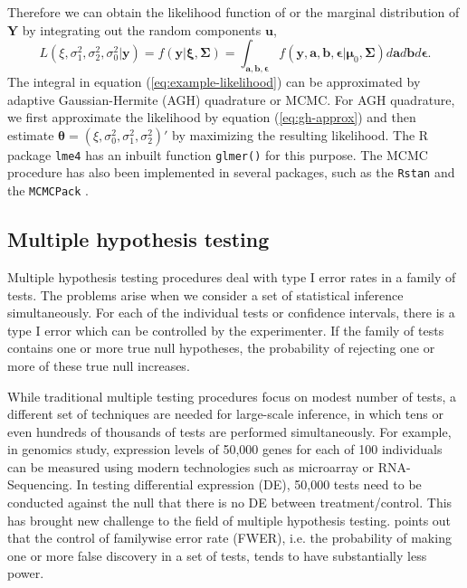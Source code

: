 Therefore we can obtain the likelihood function of or the marginal distribution of $\bm Y$ by
integrating out the random components $\bm u$,
\begin{equation}\label{eq:example-likelihood}
	L(\xi, \sigma_1^2, \sigma_2^2, \sigma_0^2|\bm y)=f(\bm y|\bm \xi, \bm \Sigma)=
	\int_{\bm{a,b,\epsilon}} f(\bm y, \bm a, \bm b, \bm \epsilon |\bm \mu_0, \bm \Sigma)d\bm a d 
	\bm b
	d\bm \epsilon .
\end{equation}
The integral in equation (\ref{eq:example-likelihood}) can be approximated by adaptive
Gaussian-Hermite (AGH) quadrature or MCMC. For AGH quadrature, we first approximate the likelihood
by equation (\ref{eq:gh-approx}) and then estimate $\bm\theta = (\xi, \sigma_0^2, \sigma_1^2,
\sigma_2^2)'$ by maximizing the resulting likelihood. The R package \verb"lme4" 
\citep{bates2012lme4} 
has
an inbuilt function \verb"glmer()" for this purpose. The MCMC procedure has also been implemented 
in several
packages, such as the \verb|Rstan| \citep{Rstan} and the \verb|MCMCPack| 
\citep{martin2011mcmcpack}. 

\subsection{Multiple hypothesis testing}
Multiple hypothesis testing procedures deal with type I error rates in a family of tests. The
problems arise when we consider a set of statistical inference simultaneously.  For each of the
individual tests or confidence intervals, there is a type I error which can be controlled by the
experimenter.  If the family of tests contains one or more true null hypotheses, the probability of
rejecting one or more of these true null increases. 

While traditional multiple testing procedures focus on modest number of tests, a different set of
techniques are needed for large-scale inference, in which tens or even hundreds of thousands of
tests are performed simultaneously. For example, in genomics study, expression levels of 50,000
genes for each of 100 individuals can be measured using modern technologies such as microarray or
RNA-Sequencing. In testing differential expression (DE), 50,000 tests need to be conducted against
the null that there is no DE between treatment/control. This has brought new challenge to the field
of multiple hypothesis testing. \citet{benjamini1995controlling} points out that the control of
familywise error rate (FWER), i.e. the probability of making one or more false discovery in a set
of
tests, tends to have substantially less power. 

